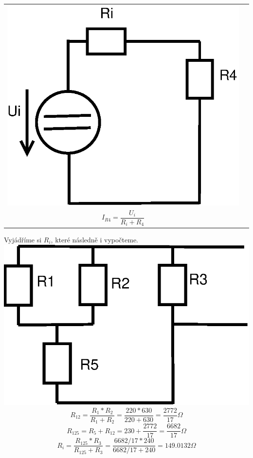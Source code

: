 \documentclass[a4paper, 12pt]{article}
\begin{document}
\begin{tabular}{ c c }
    \includegraphics[scale=0.5]{pr2/bb_2.eps}
    &
    \begin{minipage}{4cm}
        .\\[-4cm]
        $$ I_{R4} = \frac{U_i}{R_i + R_4} $$
    \end{minipage}
\end{tabular}
\vspace{3mm}

Vyjádříme si $R_i$, které následně i vypočteme. 
\\[5mm]
\includegraphics[scale=0.5]{pr2/bb_3.eps}
\vspace{1mm}
$$ R_{12} = \frac{R_1 * R_2}{R_1 + R_2} = \frac{220 * 630}{220 + 630} = \frac{2772}{17} \Omega $$
\vspace{1mm}
$$ R_{125} = R_5 + R_{12} = 230 + \frac{2772}{17} = \frac{6682}{17} \Omega$$
\vspace{1mm}
$$ R_i = \frac{R_{125} * R_3}{R_{125} + R_3} = \frac{6682/17 * 240}{6682/17 + 240} = 149.0132 \Omega $$
\end{document}
